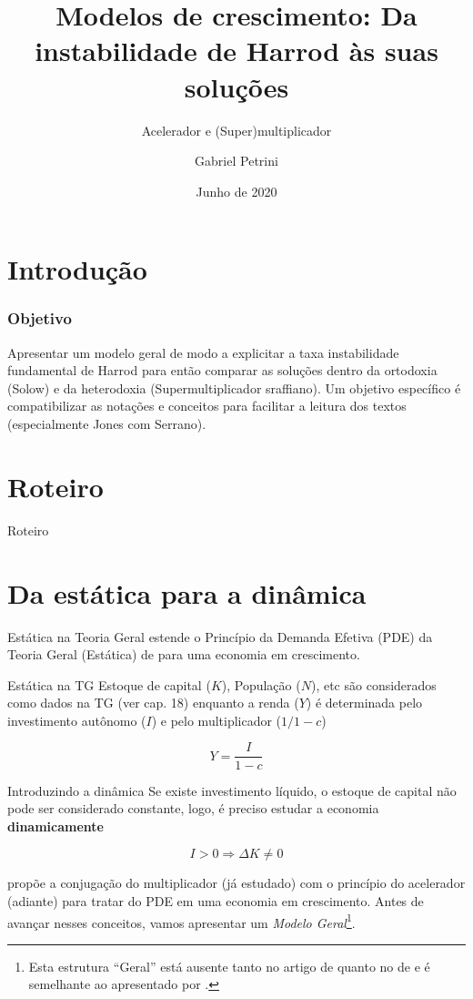 \documentclass[10pt]{beamer}
\author{Gabriel Petrini}
\title{Modelos de crescimento: Da instabilidade de Harrod às suas soluções}
\subtitle{Acelerador e (Super)multiplicador}
\date{Junho de 2020}
\begin{document}
	
\begin{frame}[plain]
	\maketitle
\end{frame}

\section{Introdução}
	
\begin{frame}
\frametitle{Objetivo}
Apresentar um modelo geral de modo a explicitar a taxa instabilidade fundamental de Harrod para então comparar as soluções dentro da ortodoxia (Solow) e da heterodoxia (Supermultiplicador sraffiano). Um objetivo específico é compatibilizar as notações e conceitos para facilitar a leitura dos textos (especialmente Jones com Serrano).
\end{frame}



\section{Roteiro}
\begin{frame}{Roteiro}
\tableofcontents
\end{frame}

\section{Da estática para a dinâmica}

\begin{frame}{Estática na Teoria Geral}
\textcite{harrod_essay_1939} estende o Princípio da Demanda Efetiva (PDE) da Teoria Geral (Estática) de \textcite{keynes_general_1936}  para uma economia em crescimento.

\begin{alertblock}{Estática na TG}
	Estoque de capital ($K$), População ($N$), etc são considerados como dados na TG (ver cap. 18) enquanto a renda ($Y$) é determinada pelo investimento autônomo ($I$) e pelo multiplicador ($1/1-c$)
	
	$$
	Y = \frac{I}{1-c}
	$$
\end{alertblock}
\end{frame}

\begin{frame}{Introduzindo a dinâmica}
Se existe investimento líquido, o estoque de capital não pode ser considerado constante, logo, é preciso estudar a economia \textbf{dinamicamente}

$$
I > 0 \Rightarrow \Delta K \neq 0
$$

\textcite{harrod_essay_1939} propõe a conjugação do multiplicador (já estudado) com o princípio do acelerador (adiante) para tratar do PDE em uma economia em crescimento. Antes de avançar nesses conceitos, vamos apresentar um \textit{Modelo Geral}\footnote{Esta estrutura ``Geral'' está ausente tanto no artigo de \textcite{harrod_essay_1939} quanto no de \textcite{solow_contribution_1956} e é semelhante ao apresentado por \textcite{serrano_trouble_2019}.}.
\end{frame}
\end{document}
